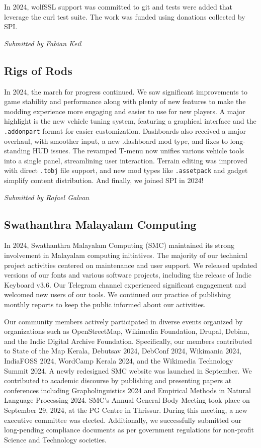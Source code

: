 \documentclass[a4paper]{report}
\begin{document}
In 2024, wolfSSL support was committed to git and tests were added that leverage the curl test suite. The work was funded using donations collected by SPI.

{\em Submitted by Fabian Keil}

\subsection{Rigs of Rods}

In 2024, the march for progress continued. We saw significant improvements to game stability and performance along with plenty of new features to make the modding experience more engaging and easier to use for new players. A major highlight is the new vehicle tuning system, featuring a graphical interface and the {\tt .addonpart} format for easier customization. Dashboards also received a major overhaul, with smoother input, a new .dashboard mod type, and fixes to long-standing HUD issues. The revamped T-menu now unifies various vehicle tools into a single panel, streamlining user interaction. Terrain editing was improved with direct {\tt .tobj} file support, and new mod types like {\tt .assetpack} and gadget simplify content distribution. And finally, we joined SPI in 2024!

{\em Submitted by Rafael Galvan}

\subsection{Swathanthra Malayalam Computing}

In 2024, Swathanthra Malayalam Computing (SMC) maintained its strong involvement in Malayalam computing initiatives. The majority of our technical project activities centered on maintenance and user support. We released updated versions of our fonts and various software projects, including the release of Indic Keyboard v3.6. Our Telegram channel experienced significant engagement and welcomed new users of our tools. We continued our practice of publishing monthly reports to keep the public informed about our activities.

Our community members actively participated in diverse events organized by organizations such as OpenStreetMap, Wikimedia Foundation, Drupal, Debian, and the Indic Digital Archive Foundation. Specifically, our members contributed to State of the Map Kerala, Debutsav 2024, DebConf 2024, Wikimania 2024, IndiaFOSS 2024, WordCamp Kerala 2024, and the Wikimedia Technology Summit 2024. A newly redesigned SMC website was launched in September. We contributed to academic discourse by publishing and presenting papers at conferences including Grapholinguistics 2024 and Empirical Methods in Natural Language Processing 2024. SMC's Annual General Body Meeting took place on September 29, 2024, at the PG Centre in Thrissur. During this meeting, a new executive committee was elected. Additionally, we successfully submitted our long-pending compliance documents as per government regulations for non-profit Science and Technology societies.
\end{document}
